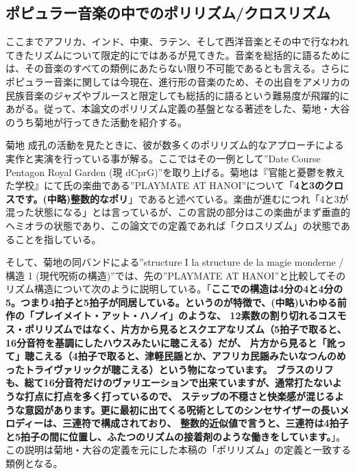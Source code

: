 \documentclass[uplatex,dvipdfmx]{ujarticle}
\begin{document}
\subsection{ポピュラー音楽の中でのポリリズム/クロスリズム}

ここまでアフリカ、インド、中東、ラテン、そして西洋音楽とその中で行なわれてきたリズムについて限定的にではあるが見てきた。音楽を総括的に語るためには、その音楽のすべての類例にあたらない限り不可能であるとも言える。さらにポピュラー音楽に関しては今現在、進行形の音楽のため、その出自をアメリカの民族音楽のジャズやブルースと限定しても総括的に語るという難易度が飛躍的にあがる。従って、本論文のポリリズム定義の基盤となる著述をした、菊地・大谷のうち菊地が行ってきた活動を紹介する。

菊地 成孔の活動を見たときに、彼が数多くのポリリズム的なアプローチによる実作と実演を行っている事が解る。ここではその一例として''Date Course Pentagon Royal Garden (現 dCprG)''を取り上げる。菊地は『官能と憂鬱を教えた学校』にて氏の楽曲である''PLAYMATE AT HANOI''\cite{works-kikuchi:01}について「{\bf 4と3のクロスです。(中略)整数的なポリ}」\cite{kikuchi-ootani:01}であると述べている。楽曲が進むにつれ「4と3が混った状態になる」とは言っているが、この言説の部分はこの楽曲がまず垂直的ヘミオラの状態であり、この論文での定義であれば「クロスリズム」の状態であることを指している。

そして、菊地の同バンドによる''structure I la structure de la magie monderne /構造 1 (現代呪術の構造)''\cite{works-kikuchi:02}では、先の''PLAYMATE AT HANOI''と比較してそのリズム構造について次のように説明している。「{\bf ここでの構造は4分の4と4分の5。つまり4拍子と5拍子が同居している。というのが特徴で、(中略)いわゆる前作の「プレイメイト・アット・ハノイ」のような、 12素数の割り切れるコスモス・ポリリズムではなく、片方から見るとスクエアなリズム（5拍子で取ると、16分音符を基調にしたハウスみたいに聴こえる）だが、 片方から見ると「訛って」聴こえる（4拍子で取ると、津軽民謡とか、アフリカ民謡みたいなつんのめったトライヴァリックが聴こえる）という物になっています。 ブラスのリフも、総て16分音符だけのヴァリエーションで出来ていますが、通常打たないような打点に打点を多く打っているので、 ステップの不穏さと快楽感が混じるような意図があります。更に最初に出てくる呪術としてのシンセサイザーの長いメロディーは、三連符で構成されており、 整数的近似値で言うと、三連符は4拍子と5拍子の間に位置し、ふたつのリズムの接着剤のような働きをしています。}」\cite{kikuchi:01}。この説明は菊地・大谷の定義を元にした本稿の「ポリリズム」の定義と一致する類例となる。
\end{document}
